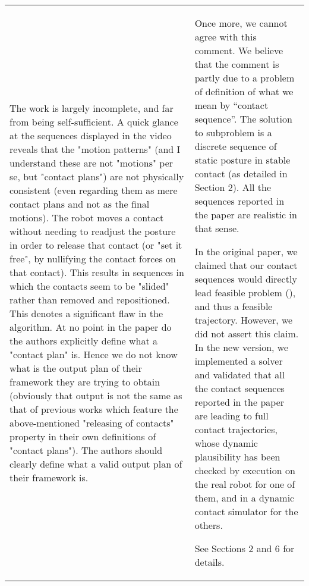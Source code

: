 \documentclass[a4paper]{article}
\begin{document}
\begin{longtable}{|p{21em}|p{21em}|}
\\ \hline %
The work is largely incomplete, and far from being self-sufficient. A quick glance at the sequences displayed in the video reveals that the "motion patterns" (and I understand these are not "motions" per se, but "contact plans") are not physically consistent (even regarding them as mere contact plans and not as the final motions). The robot moves a contact without needing to readjust the posture in order to release that contact (or "set it free", by nullifying the contact forces on that contact). This results in sequences in which the contacts seem to be "slided" rather than removed and repositioned. This denotes a significant flaw in the algorithm. At no point in the paper do the authors explicitly define what a "contact plan" is. Hence we do not know what is the output plan of their framework they are trying to obtain (obviously that output is not the same as that of previous works which feature the above-mentioned "releasing of contacts" property in their own definitions of "contact plans"). The authors should clearly define what a valid output plan of their framework is.
&
Once more, we cannot agree with this comment.
We believe that the comment is partly due to a problem of definition of what we mean by ``contact sequence''.
The solution to subproblem \mP2 is a discrete sequence of static posture in stable contact (as detailed in Section 2).
All the sequences reported in the paper are realistic in that sense.

In the original paper, we claimed that our contact sequences would directly lead feasible problem (\mP3), and thus a feasible trajectory.
However, we did not assert this claim. 
In the new version, we implemented a solver \mP3 and validated that all the contact sequences reported in the paper are leading to full contact trajectories, whose dynamic plausibility has been checked by execution on the real robot for one of them, and in a dynamic contact simulator for the others.

See Sections 2 and 6 for details.


\end{longtable}
\end{document}
